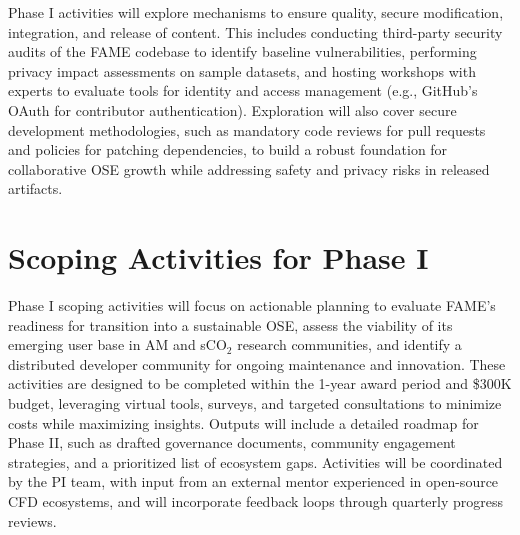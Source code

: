 \documentclass[11pt]{article}
\begin{document}
Phase I activities will explore mechanisms to ensure quality, secure modification, integration, and release of content. This includes conducting third-party security audits of the FAME codebase to identify baseline vulnerabilities, performing privacy impact assessments on sample datasets, and hosting workshops with experts to evaluate tools for identity and access management (e.g., GitHub's OAuth for contributor authentication). Exploration will also cover secure development methodologies, such as mandatory code reviews for pull requests and policies for patching dependencies, to build a robust foundation for collaborative OSE growth while addressing safety and privacy risks in released artifacts.
\vspace{-3pt}

\section*{Scoping Activities for Phase I}
\vspace{-3pt}
\noindent
Phase I scoping activities will focus on actionable planning to evaluate FAME's readiness for transition into a sustainable OSE, assess the viability of its emerging user base in AM and sCO$_2$ research communities, and identify a distributed developer community for ongoing maintenance and innovation. These activities are designed to be completed within the 1-year award period and \$300K budget, leveraging virtual tools, surveys, and targeted consultations to minimize costs while maximizing insights. Outputs will include a detailed roadmap for Phase II, such as drafted governance documents, community engagement strategies, and a prioritized list of ecosystem gaps. Activities will be coordinated by the PI team, with input from an external mentor experienced in open-source CFD ecosystems, and will incorporate feedback loops through quarterly progress reviews.
\end{document}
